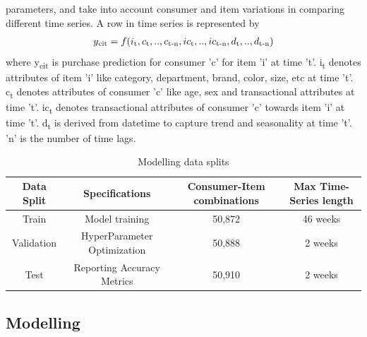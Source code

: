 parameters, and take into account consumer and item variations in comparing different time series. A row 
in time series is represented by
  \begin{equation}
    \begin{array}{l}
      y\textsubscript{cit}  = f(i\textsubscript{t}, c\textsubscript{t},..,c\textsubscript{t-n}, ic\textsubscript{t}
      ,..,ic\textsubscript{t-n}, d\textsubscript{t},..,d\textsubscript{t-n})
    \end{array}
    \label{eqn:fx}
  \end{equation}
where y\textsubscript{cit} is purchase prediction for consumer 'c' for item ’i’ at time ’t’. 
i\textsubscript{t} denotes attributes of item ’i’ like category, department, brand, color, size, etc at time 't'. 
c\textsubscript{t} denotes attributes of consumer 'c' like age, sex and transactional attributes at time 't'. 
ic\textsubscript{t} denotes transactional attributes of consumer 'c'  towards item 'i' at time 't'. 
d\textsubscript{t} is derived from datetime to capture trend and seasonality at time 't'. 
'n' is the number of time lags.

\begin{table}[t]
\caption{Modelling data splits}
\vspace{0.5 in}
\centering
\resizebox{5.5in}{!}
{%
\begin{tabular}{|c|c|c|c|}
\hline
{\bf Data Split} & {\bf Specifications} & {\bf Consumer-Item combinations} & {\bf Max Time-Series length} \\  
\hline\hline
Train  		&  Model training &  50,872 &  46 weeks \\ \hline
Validation	  		&  HyperParameter Optimization &  50,888 &  2 weeks \\ \hline
Test	  		&  Reporting Accuracy Metrics & 50,910 &  2 weeks\\
\hline
\end{tabular}
}
\label{tab:datasplit}
\end{table}

\subsection{Modelling}
